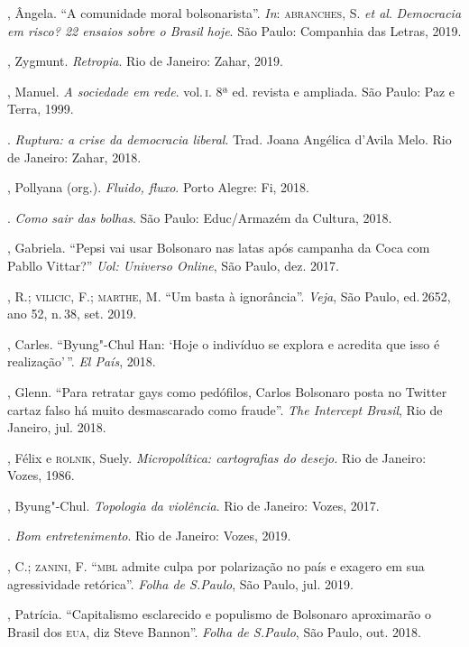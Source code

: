 \begin{bibliohedra}
, Ângela. ``A comunidade moral bolsonarista''. \textit{In}: \textsc{abranches}, S. \textit{et al}. \textit{Democracia em risco? 22 ensaios sobre o Brasil hoje}. São
Paulo: Companhia das Letras, 2019.

, Zygmunt. \textit{Retropia}. Rio de Janeiro: Zahar, 2019.

, Manuel. \textit{A sociedade em rede}. vol.\,\textsc{i}. 8ª ed.
revista e ampliada. São Paulo: Paz e Terra, 1999.

\titidem. \textit{Ruptura: a crise da democracia liberal}.
Trad. Joana Angélica d'Avila Melo. Rio de Janeiro: Zahar, 2018.

, Pollyana (org.). \textit{Fluido, fluxo}. Porto Alegre: Fi, 2018.

\titidem. \textit{Como sair das bolhas}. São Paulo: Educ/Armazém da Cultura, 2018.

, Gabriela. ``Pepsi vai usar Bolsonaro nas latas após campanha da
Coca com Pabllo Vittar?'' \textit{Uol: Universo Online}, São Paulo, dez. 2017.

, R.; \textsc{vilicic}, F.; \textsc{marthe}, M. ``Um basta à ignorância''. \textit{Veja}, São Paulo, ed.\,2652, ano 52, n.\,38, set. 2019.

, Carles. ``Byung"-Chul Han: `Hoje o indivíduo se explora e
acredita que isso é realização'\,''. \textit{El País}, 2018. 

, Glenn. ``Para retratar gays como pedófilos, Carlos Bolsonaro
posta no Twitter cartaz falso há muito desmascarado como fraude''.
\textit{The Intercept Brasil}, Rio de Janeiro, jul. 2018. 


, Félix e \textsc{rolnik}, Suely. \textit{Micropolítica: cartografias do desejo.} Rio de Janeiro: Vozes, 1986.

, Byung"-Chul. \textit{Topologia da violência}. Rio de Janeiro: Vozes,
2017.

\titidem. \textit{Bom entretenimento}. Rio de Janeiro: Vozes, 2019.

, C.; \textsc{zanini}, F. ``\textsc{mbl} admite culpa por polarização no país e exagero em sua agressividade retórica''. \textit{Folha de S.Paulo}, São
Paulo, jul. 2019.

, Patrícia. ``Capitalismo esclarecido e populismo de Bolsonaro
aproximarão o Brasil dos \textsc{eua}, diz Steve Bannon''. \textit{Folha de S.Paulo}, São Paulo, out. 2018.


\end{bibliohedra}

